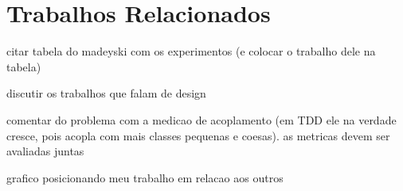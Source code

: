 \chapter{Trabalhos Relacionados}
\label{cap:trabalhos-relacionados}

citar tabela do madeyski com os experimentos (e colocar o trabalho dele na tabela)

discutir os trabalhos que falam de design

comentar do problema com a medicao de acoplamento (em TDD ele na verdade cresce, pois acopla com mais classes pequenas e coesas).
as metricas devem ser avaliadas juntas

grafico posicionando meu trabalho em relacao aos outros